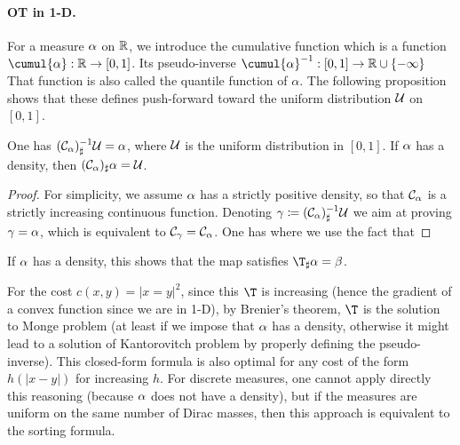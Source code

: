 \paragraph{OT in 1-D.}

For a measure $\alpha$ on $\mathbb{R}$, we introduce the cumulative function
which is a function $\cumul{\al} : \RR \rightarrow [0,1]$.
%
Its pseudo-inverse  $\cumul{\al}^{-1} : [0,1] \rightarrow \RR \cup \{-\infty\}$ 
That function is also called the quantile function of $\alpha$. 
%
The following proposition shows that these defines push-forward toward the uniform distribution $\mathcal{U}$ on $[0,1]$.

\begin{prop}
	One has $(\mathcal{C}_\alpha)^{-1}_\sharp \mathcal{U} = \alpha$,  
	where $\mathcal{U}$ is the uniform distribution in $[0,1]$. 
	If $\alpha$ has a density, then $(\mathcal{C}_\alpha)_\sharp \alpha = \mathcal{U}$.
\end{prop}
\begin{proof}
	For simplicity, we assume $\alpha$ has a strictly positive density, so that $\mathcal{C}_\alpha$ is a strictly increasing continuous function.
	Denoting $\gamma \coloneqq (\mathcal{C}_\alpha)^{-1}_\sharp \mathcal{U}$ we aim at proving $\gamma=\alpha$, which is equivalent to 
	$\mathcal{C}_\gamma=\mathcal{C}_\alpha$. One has
	\eq{
		\Cc_\ga(x) = \int_{-\infty}^x \d \ga = \int_\RR 1_{]-\infty,x]} \d( (\Cc_\al^{-1})_\sharp \Uu)
		  	 = \int_0^1 1_{]-\infty,x]}(\Cc_\al^{-1}(z)) \d z
			 = \int_0^1 1_{[0,\Cc_\al(x)]}(z) \d z
			 = \Cc_\al(x)
	}
	where we use the fact that 
\end{proof}

%
If $\alpha$ has a density, this shows that the map
satisfies $\T_\sharp \al = \be$. 

For the cost $c(x,y)=|x=y|^2$, since this $\T$ is increasing (hence the gradient of a convex function since we are in 1-D), by Brenier's theorem, $\T$ is the solution to Monge problem (at least if we impose that $\alpha$ has a density, otherwise it might lead to a solution of Kantorovitch problem by properly defining the pseudo-inverse). 
%
This closed-form formula is also optimal for any cost of the form $h(|x-y|)$ for increasing $h$. 
%
For discrete measures, one cannot apply directly this reasoning (because $\alpha$ does not have a density), but if the measures are uniform on the same number of Dirac masses, then this approach is equivalent to the sorting formula. 

